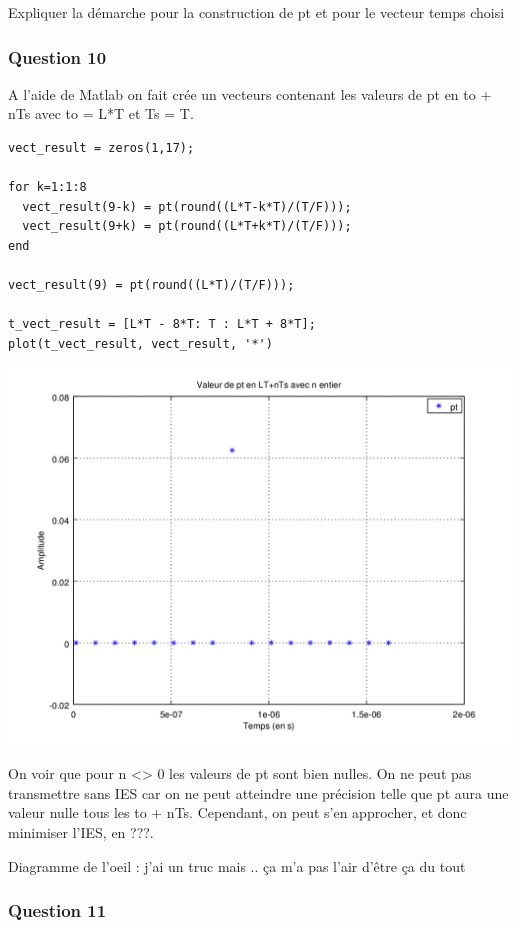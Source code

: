 \documentclass{acm_proc_article-sp}
\begin{document}
Expliquer la démarche pour la construction de pt et pour le vecteur temps choisi

\subsubsection{Question 10}

A l'aide de Matlab on fait crée un vecteurs contenant les valeurs de pt en to + nTs avec to = L*T et Ts = T.

\begin{lstlisting}
vect_result = zeros(1,17);

for k=1:1:8
  vect_result(9-k) = pt(round((L*T-k*T)/(T/F)));
  vect_result(9+k) = pt(round((L*T+k*T)/(T/F)));
end

vect_result(9) = pt(round((L*T)/(T/F)));

t_vect_result = [L*T - 8*T: T : L*T + 8*T];
plot(t_vect_result, vect_result, '*')
\end{lstlisting}

\begin{center}
\includegraphics[scale=0.45]{pt_nyquist_10.png}
\end{center}

On voir que pour n <> 0 les valeurs de pt sont bien nulles. On ne peut pas transmettre sans IES car on ne peut atteindre une précision telle que pt aura une valeur nulle tous les to + nTs. Cependant, on peut s'en approcher, et donc minimiser l'IES, en ???.

Diagramme de l'oeil : j'ai un truc mais .. ça m'a pas l'air d'être ça du tout

\subsubsection{Question 11}
\end{document}
